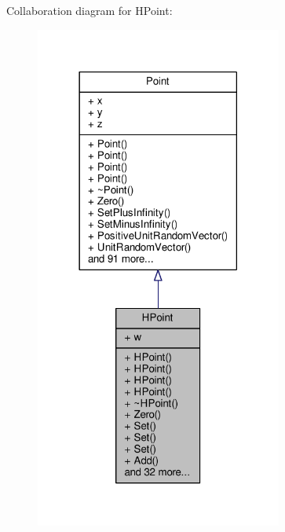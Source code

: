 Collaboration diagram for H\+Point\+:
\nopagebreak
\begin{figure}[H]
\begin{center}
\leavevmode
\includegraphics[width=230pt]{dd/d57/classHPoint__coll__graph}
\end{center}
\end{figure}

